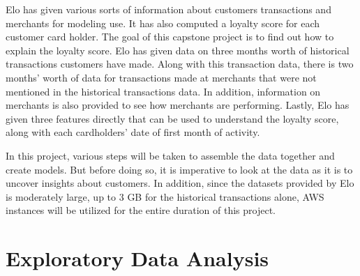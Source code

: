 \documentclass[journal, a4paper]{IEEEtran}
\begin{document}
Elo has given various sorts of information about customers transactions and merchants for modeling use. It has also computed a loyalty score for each customer card holder. The goal of this capstone project is to find out how to explain the loyalty score. Elo has given data on three months worth of historical transactions customers have made. Along with this transaction data, there is two months' worth of data for transactions made at merchants that were not mentioned in the historical transactions data. In addition, information on merchants is also provided to see how merchants are performing. Lastly, Elo has given three features directly that can be used to understand the loyalty score, along with each cardholders' date of first month of activity. 

In this project, various steps will be taken to assemble the data together and create models. But before doing so, it is imperative to look at the data as it is to uncover insights about customers. In addition, since the datasets provided by Elo is moderately large, up to $3$ GB for the historical transactions alone, AWS instances will be utilized for the entire duration of this project. 

\section{Exploratory Data Analysis}
\end{document}
